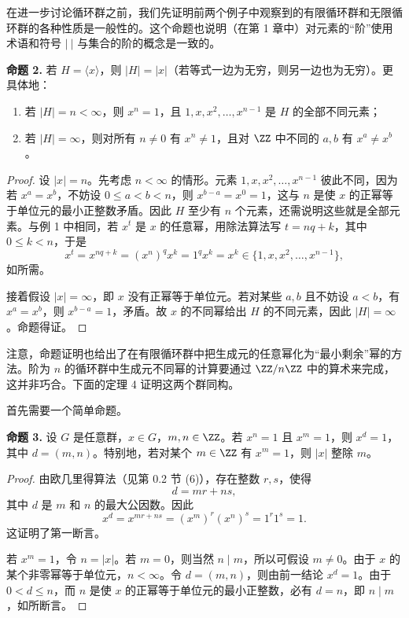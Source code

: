 在进一步讨论循环群之前，我们先证明前两个例子中观察到的有限循环群和无限循环群的各种性质是一般性的。这个命题也说明（在第 1 章中）对元素的“阶”使用术语和符号 $|\ |$ 与集合的阶的概念是一致的。

\medskip
\noindent\textbf{命题 2.} 若 $H=\langle x\rangle$，则 $|H|=|x|$（若等式一边为无穷，则另一边也为无穷）。更具体地：
\begin{enumerate}[label=(\arabic*)]
  \item 若 $|H|=n<\infty$，则 $x^n=1$，且 $1,x,x^2,\ldots,x^{n-1}$ 是 $H$ 的全部不同元素；
  \item 若 $|H|=\infty$，则对所有 $n\neq 0$ 有 $x^n\neq 1$，且对 $\ZZ$ 中不同的 $a,b$ 有 $x^a\neq x^b$。
\end{enumerate}

\begin{proof}
设 $|x|=n$。先考虑 $n<\infty$ 的情形。元素 $1,x,x^2,\ldots,x^{n-1}$ 彼此不同，因为若 $x^a=x^b$，不妨设 $0\leq a<b<n$，则 $x^{b-a}=x^0=1$，这与 $n$ 是使 $x$ 的正幂等于单位元的最小正整数矛盾。因此 $H$ 至少有 $n$ 个元素，还需说明这些就是全部元素。与例 1 中相同，若 $x^t$ 是 $x$ 的任意幂，用除法算法写 $t=nq+k$，其中 $0\leq k<n$，于是
\[
  x^t=x^{nq+k}=(x^n)^qx^k=1^qx^k=x^k\in\{1,x,x^2,\ldots,x^{n-1}\},
\]
如所需。

接着假设 $|x|=\infty$，即 $x$ 没有正幂等于单位元。若对某些 $a,b$ 且不妨设 $a<b$，有 $x^a=x^b$，则 $x^{b-a}=1$，矛盾。故 $x$ 的不同幂给出 $H$ 的不同元素，因此 $|H|=\infty$。命题得证。
\end{proof}

注意，命题证明也给出了在有限循环群中把生成元的任意幂化为“最小剩余”幂的方法。阶为 $n$ 的循环群中生成元不同幂的计算要通过 $\ZZ/n\ZZ$ 中的算术来完成，这并非巧合。下面的定理 4 证明这两个群同构。

首先需要一个简单命题。

\medskip
\noindent\textbf{命题 3.} 设 $G$ 是任意群，$x\in G$，$m,n\in\ZZ$。若 $x^n=1$ 且 $x^m=1$，则 $x^d=1$，其中 $d=(m,n)$。特别地，若对某个 $m\in\ZZ$ 有 $x^m=1$，则 $|x|$ 整除 $m$。

\begin{proof}
由欧几里得算法（见第 0.2 节 (6)），存在整数 $r,s$，使得
\[
  d=mr+ns,
\]
其中 $d$ 是 $m$ 和 $n$ 的最大公因数。因此
\[
  x^d=x^{mr+ns}=(x^m)^r(x^n)^s=1^r1^s=1.
\]
这证明了第一断言。

若 $x^m=1$，令 $n=|x|$。若 $m=0$，则当然 $n\mid m$，所以可假设 $m\neq0$。由于 $x$ 的某个非零幂等于单位元，$n<\infty$。令 $d=(m,n)$，则由前一结论 $x^d=1$。由于 $0<d\leq n$，而 $n$ 是使 $x$ 的正幂等于单位元的最小正整数，必有 $d=n$，即 $n\mid m$，如所断言。
\end{proof}

